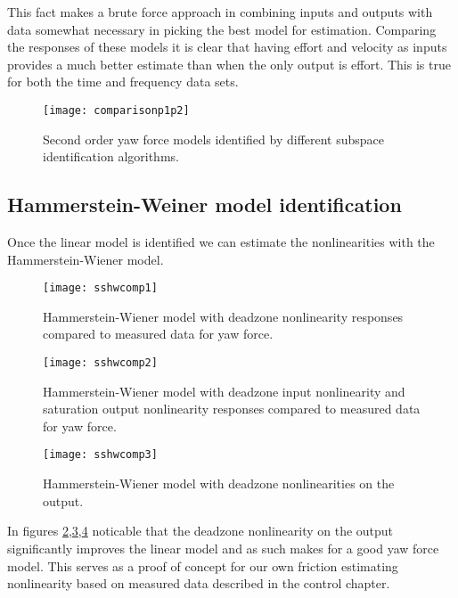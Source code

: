 This fact makes a brute force approach in combining inputs and outputs with data somewhat necessary in picking the best model for estimation.
Comparing the responses of these models it is clear that having effort and velocity as inputs provides a much better estimate than when the only output is effort.
This is true for both the time and frequency data sets.

\begin{figure}[H]
\centering
\hspace{-2em}\texttt{[image: comparisonp1p2]}
\caption{Second order yaw force models identified by different subspace identification algorithms.}
\label{fig:1LMI2}
\end{figure}

\subsection{Hammerstein-Weiner model identification}

Once the linear model is identified we can estimate the nonlinearities with the Hammerstein-Wiener model.

\begin{figure}[H]
\centering
\hspace{-2.5em}\texttt{[image: sshwcomp1]}
\caption{Hammerstein-Wiener model with deadzone nonlinearity responses compared to measured data for yaw force.}
\label{fig:2LMI}
\end{figure}

\begin{figure}[H]
\centering
\hspace{-2.5em}\texttt{[image: sshwcomp2]}
\caption{Hammerstein-Wiener model with deadzone input nonlinearity and saturation output nonlinearity responses compared to measured data for yaw force.}
\label{fig:2LMI1}
\end{figure}

\begin{figure}[H]
\centering
\hspace{-2.5em}\texttt{[image: sshwcomp3]}
\caption{Hammerstein-Wiener model with deadzone nonlinearities on the output.}
\label{fig:2LMI2}
\end{figure}

In figures \ref{fig:2LMI},\ref{fig:2LMI1},\ref{fig:2LMI2} noticable that the deadzone nonlinearity on the output significantly improves the linear model and as such makes for a good yaw force model.
This serves as a proof of concept for our own friction estimating nonlinearity based on measured data described in the control chapter.


